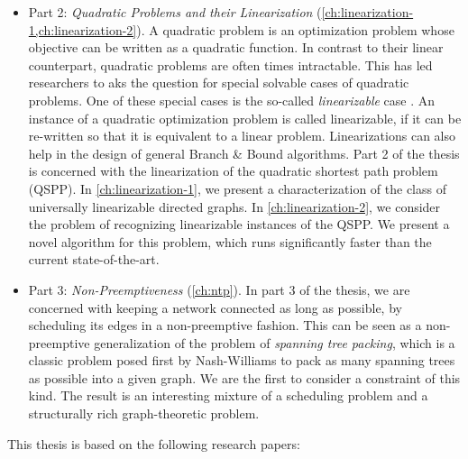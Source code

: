 \begin{itemize}
\item Part 2: \emph{Quadratic Problems and their Linearization}  (\cref{ch:linearization-1,ch:linearization-2}). 
A quadratic problem is an optimization problem whose objective can be written as a quadratic function. 
In contrast to their linear counterpart, quadratic problems are often times intractable. 
This has led researchers to aks the question for special solvable cases of quadratic problems. One of these special cases is the so-called \emph{linearizable} case \cite{bookhold1990contribution}. 
An instance of a quadratic optimization problem is called linearizable, if it can be re-written so that it is equivalent to a linear problem. Linearizations can also help in the design of general Branch \& Bound algorithms. Part 2 of the thesis is concerned with the linearization of the quadratic shortest path problem (QSPP). In \cref{ch:linearization-1}, we present a characterization of the class of universally linearizable directed graphs. In \cref{ch:linearization-2}, we consider the problem of recognizing linearizable instances of the QSPP. We present a novel algorithm for this problem, which runs significantly faster than the current state-of-the-art.

\item Part 3: \emph{Non-Preemptiveness} (\cref{ch:ntp}). In part 3 of the thesis, we are concerned with keeping a network connected as long as possible, by scheduling its edges in a non-preemptive fashion.
This can be seen as a non-preemptive generalization of the problem of \emph{spanning tree packing}, which is a classic problem posed first by Nash-Williams \cite{Nash-Williams1961} to pack as many spanning trees as possible into a given graph. We are the first to consider a constraint of this kind. The result is an interesting mixture of a scheduling problem and a structurally rich graph-theoretic problem.
\end{itemize}

This thesis is based on the following research papers:

